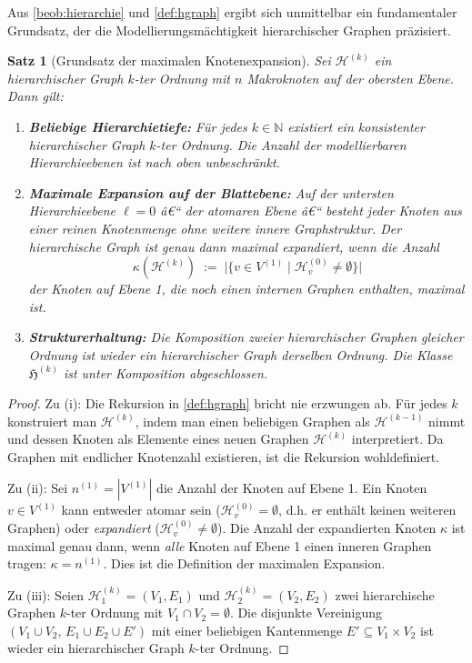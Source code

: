 ﻿\documentclass[12pt,a4paper,twoside]{article}
\theoremstyle{definition}
\theoremstyle{plain}
\newtheorem{theorem}{Satz}[section]
\theoremstyle{remark}
\begin{document}
Aus \cref{beob:hierarchie} und \cref{def:hgraph} ergibt sich unmittelbar
ein fundamentaler Grundsatz, der die Modellierungsmächtigkeit
hierarchischer Graphen präzisiert.

\begin{theorem}[Grundsatz der maximalen Knotenexpansion]
	\label{thm:maxexpansion}
	Sei $\mathcal{H}^{(k)}$ ein hierarchischer Graph $k$-ter Ordnung mit
	$n$ Makroknoten auf der obersten Ebene.  Dann gilt:
	
	\begin{enumerate}[label=\textbf{(\roman*)}]
		\item \textbf{Beliebige Hierarchietiefe:} Für jedes $k \in \mathbb{N}$
		existiert ein konsistenter hierarchischer Graph $k$-ter Ordnung.
		Die Anzahl der modellierbaren Hierarchieebenen ist nach oben
		unbeschränkt.
		
		\item \textbf{Maximale Expansion auf der Blattebene:}
		Auf der untersten Hierarchieebene $\ell = 0$ â€“ der
		\emph{atomaren Ebene} â€“ besteht jeder Knoten aus einer
		reinen Knotenmenge ohne weitere innere Graphstruktur.
		Der hierarchische Graph ist genau dann \emph{maximal
			expandiert}, wenn die Anzahl
		\[
		\kappa(\mathcal{H}^{(k)}) \;:=\;
		\bigl|\{v \in V^{(1)} \mid \mathcal{H}^{(0)}_v \neq \emptyset\}\bigr|
		\]
		der Knoten auf Ebene 1, die noch einen internen Graphen
		enthalten, \emph{maximal} ist.
		
		\item \textbf{Strukturerhaltung:} Die Komposition zweier
		hierarchischer Graphen gleicher Ordnung ist wieder ein
		hierarchischer Graph derselben Ordnung.  Die Klasse
		$\mathfrak{H}^{(k)}$ ist unter Komposition abgeschlossen.
	\end{enumerate}
\end{theorem}

\begin{proof}
	Zu (i): Die Rekursion in \cref{def:hgraph} bricht nie erzwungen ab.
	Für jedes $k$ konstruiert man $\mathcal{H}^{(k)}$, indem man einen
	beliebigen Graphen als $\mathcal{H}^{(k-1)}$ nimmt und dessen Knoten
	als Elemente eines neuen Graphen $\mathcal{H}^{(k)}$ interpretiert.
	Da Graphen mit endlicher Knotenzahl existieren, ist die Rekursion
	wohldefiniert.
	
	Zu (ii): Sei $n^{(1)} = |V^{(1)}|$ die Anzahl der Knoten auf Ebene 1.
	Ein Knoten $v \in V^{(1)}$ kann entweder atomar sein ($\mathcal{H}^{(0)}_v = \emptyset$,
	d.h. er enthält keinen weiteren Graphen) oder \emph{expandiert}
	($\mathcal{H}^{(0)}_v \neq \emptyset$).  Die Anzahl der expandierten
	Knoten $\kappa$ ist maximal genau dann, wenn \emph{alle} Knoten auf
	Ebene 1 einen inneren Graphen tragen: $\kappa = n^{(1)}$.  Dies ist
	die Definition der maximalen Expansion.
	
	Zu (iii): Seien $\mathcal{H}^{(k)}_1 = (V_1, E_1)$ und
	$\mathcal{H}^{(k)}_2 = (V_2, E_2)$ zwei hierarchische Graphen
	$k$-ter Ordnung mit $V_1 \cap V_2 = \emptyset$.  Die disjunkte
	Vereinigung $(V_1 \cup V_2,\, E_1 \cup E_2 \cup E')$ mit einer
	beliebigen Kantenmenge $E' \subseteq V_1 \times V_2$ ist wieder ein
	hierarchischer Graph $k$-ter Ordnung.\qquad
\end{proof}
\end{document}
